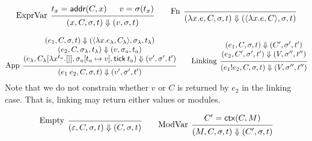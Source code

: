 \documentclass{article}
\theoremstyle{definition}
\newcommand*{\link}[2]{{#1}\mathtt{!}{#2}}
\newcommand*{\addr}{\mathsf{addr}}
\newcommand*{\tick}{\mathsf{tick}}
\newcommand*{\modctx}{\mathsf{ctx}}
\begin{document}
\[
  \begin{prooftree}
    \hypo{t_{x}=\addr(C,x)}
    \hypo{v=\sigma(t_{x})}
    \infer[left label=ExprVar]2{
    (x, C, \sigma, t)
    \Downarrow
    (v, \sigma, t)
    }
  \end{prooftree}\qquad
  \begin{prooftree}
    \infer[left label=Fn]0{
    (\lambda x.e, C, \sigma, t)
    \Downarrow
    (\langle\lambda x.e, C\rangle, \sigma, t)
    }
  \end{prooftree}
\]

\[
  \begin{prooftree}
    \hypo{
      \begin{matrix}
        (e_{1}, C, \sigma, t)
        \Downarrow
        (\langle\lambda x.e_{\lambda}, C_{\lambda}\rangle, \sigma_{\lambda}, t_{\lambda}) \\
        (e_{2}, C, \sigma_{\lambda}, t_{\lambda})
        \Downarrow
        (v, \sigma_{a}, t_{a})                                                            \\
        (e_{\lambda}, C_{\lambda}[\lambda x^{t_{a}}.[]], \sigma_{a}[t_{a}\mapsto v], \tick\:t_{a})
        \Downarrow
        (v', \sigma',t')
      \end{matrix}
    }
    \infer[left label={App}]1{
    (e_{1}\:e_{2}, C, \sigma, t)
    \Downarrow
    (v', \sigma',t')
    }
  \end{prooftree}\qquad
  \begin{prooftree}
    \hypo{
      \begin{matrix}
        (e_{1}, C, \sigma, t)
        \Downarrow
        (C', \sigma', t') \\
        (e_{2}, C', \sigma', t')
        \Downarrow
        (V, \sigma'', t'')
      \end{matrix}
    }
    \infer[left label=Linking]1{
    (\link{e_{1}}{e_{2}}, C, \sigma, t)
    \Downarrow
    (V, \sigma'', t'')
    }
  \end{prooftree}
\]
Note that we do not constrain whether $v$ or $C$ is returned by $e_{2}$ in the linking case.
That is, linking may return either values or modules.

\[
  \begin{prooftree}
    \infer[left label=Empty]0{
    (\varepsilon, C, \sigma, t)
    \Downarrow
    (C, \sigma, t)
    }
  \end{prooftree}\qquad
  \begin{prooftree}
    \hypo{C'=\modctx(C,M)}
    \infer[left label=ModVar]1{
    (M, C, \sigma, t)
    \Downarrow
    (C', \sigma, t)
    }
  \end{prooftree}
\]
\end{document}
